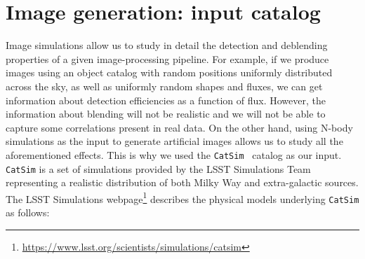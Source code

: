 \documentclass[twocolumn]{aastex62}
\begin{document}
\section{Image generation: input catalog}
\label{sec:inputs}
Image simulations allow us to study in detail the detection and deblending properties of a given image-processing pipeline. For example, if we produce images using an object catalog with random positions uniformly distributed across the sky, as well as uniformly random shapes and fluxes, we can get information about detection efficiencies as a function of flux.  However, the information about blending will not be realistic and we will not be able to capture some correlations present in real data. On the other hand, using N-body simulations as the input to generate artificial images allows us to study all the aforementioned effects. This is why we used the \texttt{CatSim}~\citep{2010SPIE.7738E..1OC,2014SPIE.9150E..14C} catalog as our input.  \texttt{CatSim} is a set of simulations provided by the LSST Simulations Team representing a realistic distribution of both Milky Way and extra-galactic sources.  The LSST Simulations webpage\footnote{\url{https://www.lsst.org/scientists/simulations/catsim}} describes the physical models underlying \texttt{CatSim} as follows:
\end{document}
